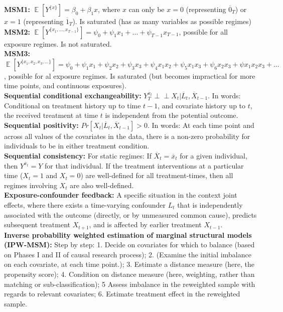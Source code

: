\documentclass[a4paper,7pt,landscape]{extarticle}
\newcommand{\indep}{\perp \!\!\! \perp} %
\DeclareMathOperator*{\E}{\mathbb{E}} %
\begin{document}
\begin{multicols}{3}
\begin{boxA}
\textbf{MSM1:} $\E [Y^{\{x\}}] = \beta_0 + \beta_1 x$, where $x$ can only be $x = 0$ (representing $\overline{0}_T$) or $x = 1$ (representing $\overline{1}_T$). Is saturated (has as many variables as possible regimes)\\
\textbf{MSM2:} $\E [Y^{\{x_1,...,x_{T-1}\}}] = \psi_0 + \psi_1 x_1 + ... + \psi_{T-1} x_{T-1}$, possible for all exposure regimes. Is not saturated.\\
\textbf{MSM3:} $\E [Y^{\{x_1,x_2,x_3,...\}}] = \psi_0 + \psi_1 x_1 + \psi_2 x_2 + \psi_3 x_3 + \psi_4 x_1 x_2 + \psi_5 x_1 x_3 + \psi_6 x_2 x_3 + \psi x_1 x_2 x_3 + ...$, possible for al exposure regimes. Is saturated (but becomes impractical for more time points, and continuous exposures).\\
\textbf{Sequential conditional exchangeability:} $Y_T^{\overline{x}_t} \indep X_t | \overline{L}_{t}, \overline{X}_{t-1}$. In words: Conditional on treatment history up to time $t - 1$, and covariate history up to $t$, the received treatment at time $t$ is independent from the potential outcome.\\
\textbf{Sequential positivity:} $Pr[X_t | \overline{L}_t, \overline{X}_{t-1}] > 0$. In words: At each time point and across all values of the covariates in the data, there is a non-zero probability for individuals to be in either treatment condition.\\
\textbf{Sequential consistency:} For static regimes: If $\overline{X}_t = \overline{x}_t$ for a given individual, then $Y^{\overline{x}_t} = Y$ for that individual. If the treatment interventions at a particular time ($X_t = 1$ and $X_t = 0$) are well-defined for all treatment-times, then all regimes involving $X_t$ are also well-defined.\\
\textbf{Exposure-confounder feedback:} A specific situation in the context joint effects, where there exists a time-varying confounder $L_t$ that is independently associated with the outcome (directly, or by unmeasured common cause), predicts subsequent treatment $X_{t+1}$, and is affected by earlier treatment $X_{t-1}$.\\
\textbf{Inverse probability weighted estimation of marginal structural models (IPW-MSM):} Step by step: 1. Decide on covariates for which to balance (based on Phases I and II of causal research process); 2. (Examine the initial imbalance on each covariate, at each time point.); 3. Estimate a distance measure (here, the propensity score); 4. Condition on distance measure (here, weighting, rather than matching or sub-classification); 5 Assess imbalance in the reweighted sample with regards to relevant covariates; 6. Estimate treatment effect in the reweighted sample.\\

\end{boxA}
\end{multicols}
\end{document}
